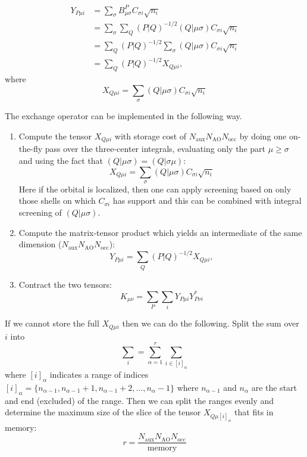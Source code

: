 \documentclass[aip,preprint]{revtex4-1}
\begin{document}
\begin{equation}
\begin{split}
Y_{P \mu i} & = \sum_{\sigma} B^{P}_{\mu \sigma} C_{\sigma i}\sqrt{n_i} \\
& = \sum_{\sigma} \sum_{Q} (P|Q)^{-1/2} (Q | \mu \sigma) C_{\sigma i}\sqrt{n_i} \\
& = \sum_{Q} (P|Q)^{-1/2} \sum_{\sigma} (Q | \mu \sigma) C_{\sigma i}\sqrt{n_i} \\
& = \sum_{Q} (P|Q)^{-1/2} X_{Q \mu i},
\end{split}
\end{equation}
where
\begin{equation}
X_{Q \mu i} = \sum_{\sigma} (Q | \mu \sigma) C_{\sigma i}\sqrt{n_i}
\end{equation}

The exchange operator can be implemented in the following way.
\begin{enumerate}
    \item Compute the tensor $X_{Q \mu i}$ with storage cost of $N_\mathrm{aux} N_{\mathrm{AO}} N_{\mathrm{occ}}$ by doing one on-the-fly pass over the three-center integrals, evaluating only the part $\mu \geq \sigma$ and using the fact that $(Q | \mu \sigma)=(Q | \sigma \mu)$:
\begin{equation}
X_{Q \mu i} = \sum_{\sigma} (Q | \mu \sigma) C_{\sigma i} \sqrt{n_i}
\end{equation}
Here if the orbital is localized, then one can apply screening based on only those shells on which $C_{\sigma i}$ has support and this can be combined with integral screening of $(Q | \mu \sigma)$.

    \item Compute the matrix-tensor product which yields an intermediate of the same dimension ($N_\mathrm{aux} N_{\mathrm{AO}} N_{\mathrm{occ}}$):
\begin{equation}
Y_{P \mu i} = \sum_{Q} (P|Q)^{-1/2} X_{Q \mu i},
\end{equation}
    \item Contract the two tensors:
\begin{equation}
K_{\mu \nu} = \sum_{P} \sum_{i} Y_{P \mu i} Y^*_{P \nu i}
\end{equation}
\end{enumerate}
If we cannot store the full $X_{Q \mu i}$ then we can do the following. Split the sum over $i$ into
\begin{equation}
\sum_i = \sum_{\alpha=1}^{r} \sum_{i \in [i]_\alpha}
\end{equation}
where $[i]_\alpha$ indicates a range of indices $[i]_\alpha = \{n_{\alpha-1}, n_{\alpha-1} + 1, n_{\alpha-1} + 2, \ldots, n_{\alpha} - 1\}$ where $n_{\alpha-1}$ and $n_{\alpha}$ are the start and end (excluded) of the range.
Then we can split the ranges evenly and determine the maximum size of the slice of the tensor $X_{Q\mu [i]_\alpha}$ that fits in memory:
\begin{equation}
r = \frac{N_\mathrm{aux} N_{\mathrm{AO}} N_{\mathrm{occ}}}{\textrm{memory}}
\end{equation}
\end{document}

